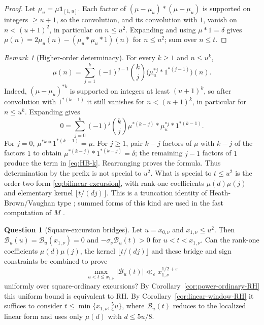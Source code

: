 \documentclass[11pt]{amsart}
\numberwithin{equation}{section}
\theoremstyle{plain}
\theoremstyle{definition}
\newtheorem{question}[theorem]{Question}
\theoremstyle{remark}
\newtheorem{remark}[theorem]{Remark}
\newcommand{\eps}{\varepsilon}
\begin{document}
\begin{proof}
Let $\mu_u=\mu\mathbf1_{[1,u]}$. Each factor of $(\mu-\mu_u)*(\mu-\mu_u)$ is
supported on integers $\ge u+1$, so the convolution, and its convolution
with $1$, vanish on $n<(u+1)^2$, in particular on $n\le u^2$. Expanding and using $\mu*1=\delta$ gives
$\mu(n)=2\mu_u(n)-(\mu_u*\mu_u*1)(n)$ for $n\le u^2$; sum over $n\le t$.
\end{proof}

\begin{remark}[Higher-order determinacy]
\label{rem:prefix-k}
For every $k\ge1$ and $n\le u^k$,
\begin{equation}
\label{eq:HB-k}
\mu(n)=\sum_{j=1}^{k}(-1)^{j-1}\binom{k}{j}
\bigl(\mu_u^{*j}*1^{*(j-1)}\bigr)(n).
\end{equation}
Indeed, $(\mu-\mu_u)^{*k}$ is supported on integers at least
$(u+1)^k$, so after convolution with $1^{*(k-1)}$ it still vanishes for
$n<(u+1)^k$, in particular for $n\le u^k$.  Expanding gives
\[
0=\sum_{j=0}^{k}(-1)^j\binom{k}{j}
\mu^{*(k-j)}*\mu_u^{*j}*1^{*(k-1)}.
\]
For $j=0$, $\mu^{*k}*1^{*(k-1)}=\mu$.  For $j\ge1$, pair
$k-j$ factors of $\mu$ with $k-j$ of the factors $1$ to obtain
$\mu^{*(k-j)}*1^{*(k-j)}=\delta$; the remaining $j-1$ factors of $1$
produce the term in \eqref{eq:HB-k}.  Rearranging proves the formula.
Thus determination by the prefix
is not special to $u^2$. What is special to $t\le u^2$ is the order-two form
\eqref{eq:bilinear-excursion}, with rank-one coefficients $\mu(d)\mu(j)$ and
elementary kernel $\lfloor t/(dj)\rfloor$. This is a truncation identity of
Heath-Brown/Vaughan type \cite{HB82}; summed forms of this kind are used in
the fast computation of $M$ \cite{HT23}.
\end{remark}

\begin{question}[Square-excursion bridges]
\label{q:excursion-constraint}
Let $u=x_{0,\nu}$ and $x_{1,\nu}\le u^2$. Then
$\mathcal B_u(u)=\mathcal B_u(x_{1,\nu})=0$ and
$-\sigma_\nu\mathcal B_u(t)>0$ for $u<t<x_{1,\nu}$. Can the rank-one
coefficients $\mu(d)\mu(j)$, the kernel $\lfloor t/(dj)\rfloor$ and these
bridge and sign constraints be combined to prove
\[
\max_{u<t\le x_{1,\nu}}|\mathcal B_u(t)|
\ll_\eps x_{1,\nu}^{1/2+\eps}
\]
uniformly over square-ordinary excursions? By
Corollary~\ref{cor:power-ordinary-RH} this uniform bound is equivalent to
RH. By Corollary~\ref{cor:linear-window-RH} it suffices to consider
$t\le\min\{x_{1,\nu},\frac54u\}$, where $\mathcal B_u(t)$ reduces to
the localized linear form and uses only $\mu(d)$ with $d\le5u/8$.
\end{question}
\end{document}
